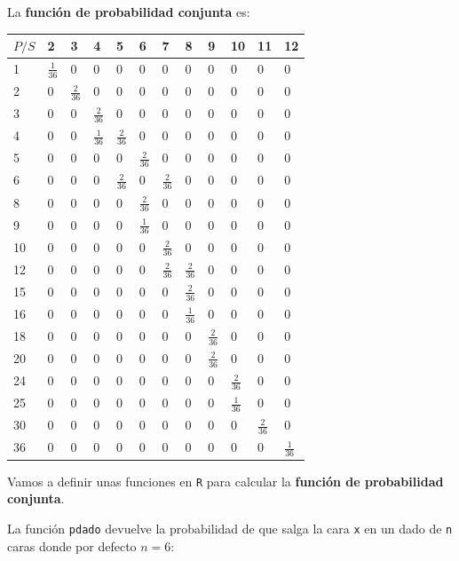 \documentclass[]{book}
\newenvironment{Shaded}{\begin{snugshade}}{\end{snugshade}}
\newcommand{\ControlFlowTok}[1]{\textcolor[rgb]{0.13,0.29,0.53}{\textbf{#1}}}
\newcommand{\DataTypeTok}[1]{\textcolor[rgb]{0.13,0.29,0.53}{#1}}
\newcommand{\DecValTok}[1]{\textcolor[rgb]{0.00,0.00,0.81}{#1}}
\newcommand{\KeywordTok}[1]{\textcolor[rgb]{0.13,0.29,0.53}{\textbf{#1}}}
\newcommand{\NormalTok}[1]{#1}
\newcommand{\OperatorTok}[1]{\textcolor[rgb]{0.81,0.36,0.00}{\textbf{#1}}}
\newcommand{\StringTok}[1]{\textcolor[rgb]{0.31,0.60,0.02}{#1}}
\begin{document}
La \textbf{función de probabilidad conjunta} es:

\begin{longtable}[]{@{}llllllllllll@{}}
\toprule
\(P/S\) & 2 & 3 & 4 & 5 & 6 & 7 & 8 & 9 & 10 & 11 & 12\tabularnewline
\midrule
\endhead
1 & \(\frac{1}{36}\) & 0 & 0 & 0 & 0 & 0 & 0 & 0 & 0 & 0 & 0\tabularnewline
2 & 0 & \(\frac{2}{36}\) & 0 & 0 & 0 & 0 & 0 & 0 & 0 & 0 & 0\tabularnewline
3 & 0 & 0 & \(\frac{2}{36}\) & 0 & 0 & 0 & 0 & 0 & 0 & 0 & 0\tabularnewline
4 & 0 & 0 & \(\frac{1}{36}\) & \(\frac{2}{36}\) & 0 & 0 & 0 & 0 & 0 & 0 & 0\tabularnewline
5 & 0 & 0 & 0 & 0 & \(\frac{2}{36}\) & 0 & 0 & 0 & 0 & 0 & 0\tabularnewline
6 & 0 & 0 & 0 & \(\frac{2}{36}\) & 0 & \(\frac{2}{36}\) & 0 & 0 & 0 & 0 & 0\tabularnewline
8 & 0 & 0 & 0 & 0 & \(\frac{2}{36}\) & 0 & 0 & 0 & 0 & 0 & 0\tabularnewline
9 & 0 & 0 & 0 & 0 & \(\frac{1}{36}\) & 0 & 0 & 0 & 0 & 0 & 0\tabularnewline
10 & 0 & 0 & 0 & 0 & 0 & \(\frac{2}{36}\) & 0 & 0 & 0 & 0 & 0\tabularnewline
12 & 0 & 0 & 0 & 0 & 0 & \(\frac{2}{36}\) & \(\frac{2}{36}\) & 0 & 0 & 0 & 0\tabularnewline
15 & 0 & 0 & 0 & 0 & 0 & 0 & \(\frac{2}{36}\) & 0 & 0 & 0 & 0\tabularnewline
16 & 0 & 0 & 0 & 0 & 0 & 0 & \(\frac{1}{36}\) & 0 & 0 & 0 & 0\tabularnewline
18 & 0 & 0 & 0 & 0 & 0 & 0 & 0 & \(\frac{2}{36}\) & 0 & 0 & 0\tabularnewline
20 & 0 & 0 & 0 & 0 & 0 & 0 & 0 & \(\frac{2}{36}\) & 0 & 0 & 0\tabularnewline
24 & 0 & 0 & 0 & 0 & 0 & 0 & 0 & 0 & \(\frac{2}{36}\) & 0 & 0\tabularnewline
25 & 0 & 0 & 0 & 0 & 0 & 0 & 0 & 0 & \(\frac{1}{36}\) & 0 & 0\tabularnewline
30 & 0 & 0 & 0 & 0 & 0 & 0 & 0 & 0 & 0 & \(\frac{2}{36}\) & 0\tabularnewline
36 & 0 & 0 & 0 & 0 & 0 & 0 & 0 & 0 & 0 & 0 & \(\frac{1}{36}\)\tabularnewline
\bottomrule
\end{longtable}

Vamos a definir unas funciones en \texttt{R} para calcular la \textbf{función de probabilidad conjunta}.

La función \texttt{pdado} devuelve la probabilidad de que salga la cara \texttt{x} en un dado de \texttt{n} caras donde por defecto \(n=6\):

\begin{Shaded}
\end{Shaded}
\end{document}

